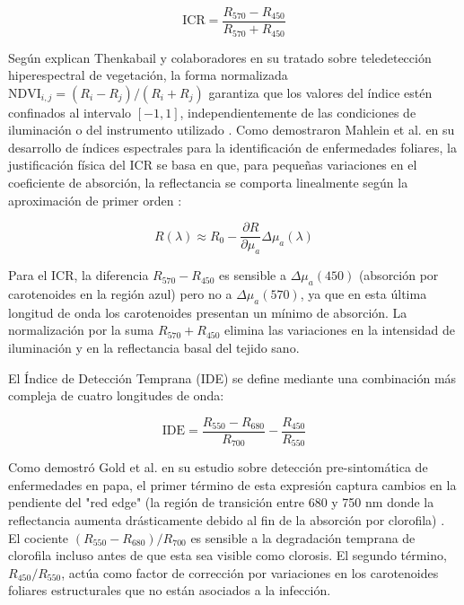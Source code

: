 \documentclass[12pt, a4paper]{article}
\begin{document}
	\begin{equation}
		\text{ICR} = \frac{R_{570} - R_{450}}{R_{570} + R_{450}}
		\label{eq:icr}
	\end{equation}
	
	Según explican Thenkabail y colaboradores en su tratado sobre teledetección hiperespectral de vegetación, la forma normalizada $\text{NDVI}_{i,j} = (R_i - R_j)/(R_i + R_j)$ garantiza que los valores del índice estén confinados al intervalo $[-1, 1]$, independientemente de las condiciones de iluminación o del instrumento utilizado \parencite{Thenkabail2012}. Como demostraron Mahlein et al. en su desarrollo de índices espectrales para la identificación de enfermedades foliares, la justificación física del ICR se basa en que, para pequeñas variaciones en el coeficiente de absorción, la reflectancia se comporta linealmente según la aproximación de primer orden \parencite{Mahlein2013}:
	
	\begin{equation}
		R(\lambda) \approx R_0 - \frac{\partial R}{\partial \mu_a} \Delta \mu_a(\lambda)
		\label{eq:reflectancia_perturbacion}
	\end{equation}
	
	Para el ICR, la diferencia $R_{570} - R_{450}$ es sensible a $\Delta \mu_a(450)$ (absorción por carotenoides en la región azul) pero no a $\Delta \mu_a(570)$, ya que en esta última longitud de onda los carotenoides presentan un mínimo de absorción. La normalización por la suma $R_{570} + R_{450}$ elimina las variaciones en la intensidad de iluminación y en la reflectancia basal del tejido sano.
	
	El Índice de Detección Temprana (IDE) se define mediante una combinación más compleja de cuatro longitudes de onda:
	
	\begin{equation}
		\text{IDE} = \frac{R_{550} - R_{680}}{R_{700}} - \frac{R_{450}}{R_{550}}
		\label{eq:ide}
	\end{equation}
	
	Como demostró Gold et al. en su estudio sobre detección pre-sintomática de enfermedades en papa, el primer término de esta expresión captura cambios en la pendiente del "red edge" (la región de transición entre 680 y 750 nm donde la reflectancia aumenta drásticamente debido al fin de la absorción por clorofila) \parencite{Gold2020}. El cociente $(R_{550} - R_{680})/R_{700}$ es sensible a la degradación temprana de clorofila incluso antes de que esta sea visible como clorosis. El segundo término, $R_{450}/R_{550}$, actúa como factor de corrección por variaciones en los carotenoides foliares estructurales que no están asociados a la infección.
	
\end{document}
